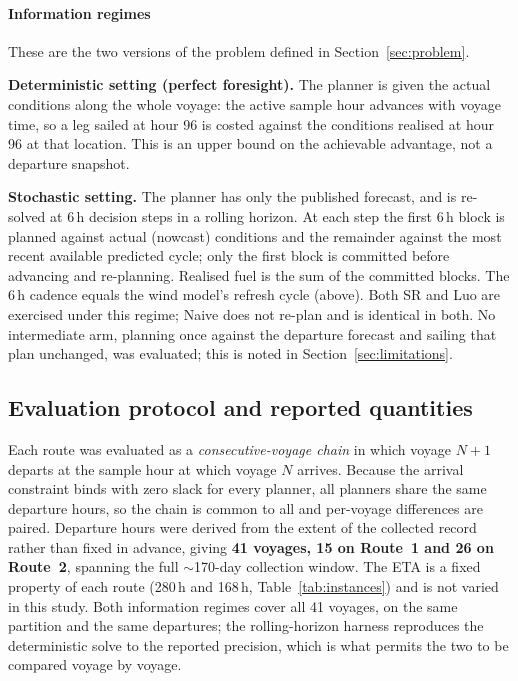 \documentclass[review,authoryear]{elsarticle}
\begin{document}
\paragraph{Information regimes}
These are the two versions of the problem defined in Section~\ref{sec:problem}.

\noindent\textbf{Deterministic setting (perfect foresight).} The planner is given the actual conditions along the whole
voyage: the active sample hour advances with voyage time, so a leg sailed at hour 96 is costed
against the conditions realised at hour 96 at that location. This is an upper bound on the achievable
advantage, not a departure snapshot.

\noindent\textbf{Stochastic setting.} The planner has only the published forecast, and is re-solved at 6\,h decision steps in a rolling horizon. At each step the
first 6\,h block is planned against actual (nowcast) conditions and the remainder against the most
recent available predicted cycle; only the first block is committed before advancing and re-planning.
Realised fuel is the sum of the committed blocks. The 6\,h cadence equals the wind model's refresh
cycle (above). Both SR and Luo are exercised under this regime; Naive does not re-plan and is
identical in both. No intermediate arm, planning once against the departure forecast and sailing
that plan unchanged, was evaluated; this is noted in Section~\ref{sec:limitations}.

\subsection{Evaluation protocol and reported quantities}
\label{sec:protocol}
Each route was evaluated as a \emph{consecutive-voyage chain} in which voyage $N{+}1$ departs at the
sample hour at which voyage $N$ arrives. Because the arrival constraint binds with zero slack for
every planner, all planners share the same departure hours, so the chain is common to all and
per-voyage differences are paired. Departure hours were derived from the extent of the collected
record rather than fixed in advance, giving \textbf{41 voyages, 15 on Route~1 and 26 on Route~2}, spanning the full $\sim$170-day collection window. The ETA is a fixed property of each route
(280\,h and 168\,h, Table~\ref{tab:instances}) and is not varied in this study. Both information
regimes cover all 41 voyages, on the same partition and the same departures; the rolling-horizon
harness reproduces the deterministic solve to the reported precision, which is what permits the
two to be compared voyage by voyage.
\end{document}
